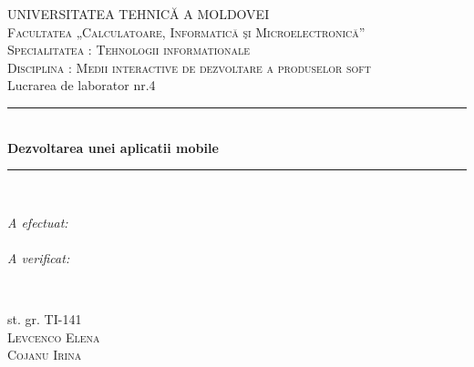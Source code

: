 \documentclass[12pt]{article}
\begin{document}
\begin{titlepage}

\newcommand{\HRule}{\rule{\linewidth}{0.5mm}} %

\center %
 

\textsc{\Large UNIVERSITATEA TEHNICĂ A MOLDOVEI}\\[1cm] %
\textsc{\Large Facultatea „Calculatoare, Informatică şi Microelectronică”}\\[0.5cm] %
\textsc{\large Specialitatea : Tehnologii informationale}\\[0.5cm] %

\textsc{\large Disciplina : Medii interactive de dezvoltare a produselor soft}\\[1cm] %
\large Lucrarea de laborator nr.4\\[1cm]

\HRule \\[0.4cm]
{ \huge \bfseries Dezvoltarea unei aplicatii mobile}\\[0.2cm] %
\HRule \\[2cm]
 

\begin{minipage}{0.4\textwidth}
\begin{flushleft} \large
\emph{A efectuat:}\\
\emph{}\\
\emph{A verificat:}\\
\end{flushleft}
\end{minipage}
~
\begin{minipage}{0.4\textwidth}
\begin{flushright} \large
st. gr. TI-141 \\
\textsc{Levcenco Elena}\\ %
\textsc{ Cojanu Irina} %
\end{flushright}
\end{minipage}\\[3cm]


\end{titlepage}
\end{document}
